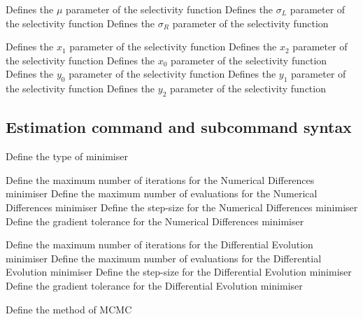  {Defines the $\mu$ parameter of the selectivity function}
 {Defines the $\sigma_L$ parameter of the selectivity function}
 {Defines the $\sigma_R$ parameter of the selectivity function}
\par\textbf{}\par
{} {Defines the $x_1$ parameter of the selectivity function}
 {Defines the $x_2$ parameter of the selectivity function}
 {Defines the $x_0$ parameter of the selectivity function}
 {Defines the $y_0$ parameter of the selectivity function}
 {Defines the $y_1$ parameter of the selectivity function}
 {Defines the $y_2$ parameter of the selectivity function}
\subsection{Estimation command and subcommand syntax}
\par
\par {}\par
{} {Define the type of minimiser}
\par\textbf{}\par
{} {Define the maximum number of iterations for the Numerical Differences minimiser}
 {Define the maximum number of evaluations for the Numerical Differences minimiser}
 {Define the step-size for the Numerical Differences minimiser}
 {Define the gradient tolerance for the Numerical Differences minimiser}
\par\textbf{}\par
{} {Define the maximum number of iterations for the Differential Evolution minimiser}
 {Define the maximum number of evaluations for the Differential Evolution minimiser}
 {Define the step-size for the Differential Evolution minimiser}
 {Define the gradient tolerance for the Differential Evolution minimiser}
\par {}\par
{} {Define the method of MCMC}
\par\textbf{}\par

